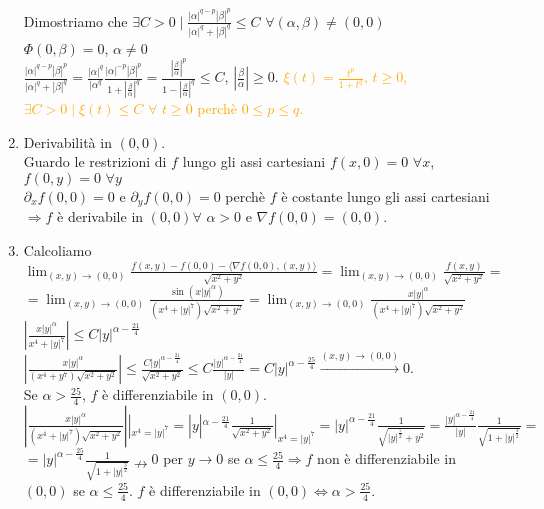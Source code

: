 \begin{exbar}
\begin{example}
\begin{enumerate}
		
		{\color{blue} Dimostriamo che $\exists C > 0 \mid \frac{|\alpha|^{q-p}|\beta|^{p}}{|\alpha|^q+|\beta|^q}\leq C\,\, \forall (\alpha,\beta)\neq(0,0)$\\
			$\Phi(0,\beta)=0$, $\alpha \neq 0$\\
			$\frac{|\alpha|^{q-p}|\beta|^p}{|\alpha|^q+|\beta|^q}=\frac{|\alpha|^q}{|\alpha^q}\frac{|\alpha|^{-p}|\beta|^p}{1+|\frac{\beta}{\alpha}|^q}=\frac{|\frac{\beta}{\alpha}|^p}{1-|\frac{\beta}{\alpha}|^q}\leq C$, $|\frac{\beta}{\alpha}|\geq 0$.}
		\textcolor{orange}{$\xi(t)=\frac{t^p}{1+t^q}$, $t\geq 0$, $\exists C > 0 \mid \xi(t)\leq C \,\, \forall\,\, t \geq 0$ perchè $0 \leq p \leq q$.}
		
		
		\item Derivabilità in $(0,0)$.\\
		Guardo le restrizioni di $f$ lungo gli assi cartesiani $f(x,0)=0\,\, \forall x$, $f(0,y)=0\,\, \forall y$\\
		$\partial_xf(0,0)=0$ e $\partial_yf(0,0)=0$ perchè $f$ è costante lungo gli assi cartesiani $\Rightarrow f$ è derivabile in $(0,0) \forall \,\, \alpha >0$ e $\nabla f(0,0)=(0,0)$.
		
		\item Calcoliamo $\lim_{(x,y)\rightarrow(0,0)}\frac{f(x,y)-f(0,0)-\langle \nabla f(0,0),(x,y) \rangle}{\sqrt{x^2+y^2}}=\lim_{(x,y)\rightarrow(0,0)}\frac{f(x,y)}{\sqrt{x^2+y^2}}=$\\$=\lim_{(x,y)\rightarrow(0,0)}\frac{\sin(x|y|^\alpha)}{(x^4+|y|^7)\sqrt{x^2+y^2}}=\lim_{(x,y)\rightarrow(0,0)}\frac{x|y|^\alpha}{(x^4+|y|^7)\sqrt{x^2+y^2}}$\\
		$|\frac{x|y|^\alpha}{x^4+|y|^7}|\leq C|y|^{\alpha-\frac{21}{4}}$\\
		$|\frac{x|y|^\alpha}{(x^4+y^7)\sqrt{x^2+y^2}}|\leq \frac{C|y|^{\alpha-\frac{21}{4}}}{\sqrt{x^2+y^2}}\leq C \frac{|y|^{\alpha-\frac{21}{4}}}{|y|}=C |y|^{\alpha -\frac{25}{4}}\xrightarrow{(x,y)\rightarrow(0,0)}0 $.\\
		Se $\alpha > \frac{25}{4}$, $f$ è differenziabile in $(0,0)$.\\
		$|\frac{x|y|^\alpha}{(x^4+|y|^7)\sqrt{x^2+y^2}}||_{x^4=|y|^7}=|y|^{\alpha -\frac{21}{4}}\frac{1}{\sqrt{x^2+y^2}}|_{x^4=|y|^7}=|y|^{\alpha-\frac{21}{4}}\frac{1}{\sqrt{|y|^{\frac{7}{2}}+y^2}}=\frac{|y|^{\alpha-\frac{21}{4}}}{|y|}\frac{1}{\sqrt{1+|y|^{\frac{3}{2}}}}=$\\
		$=|y|^{\alpha-\frac{25}{4}}\frac{1}{\sqrt{1+|y|^{\frac{3}{2}}}}\nrightarrow 0$ per $y \rightarrow 0$ se $\alpha \leq \frac{25}{4} \Rightarrow f$ non è differenziabile in $(0,0)$ se $\alpha \leq \frac{25}{4}$. $f$ è differenziabile in $(0,0)\Leftrightarrow \alpha > \frac{25}{4}$. 
	\end{enumerate}
\end{example}
\end{exbar}


